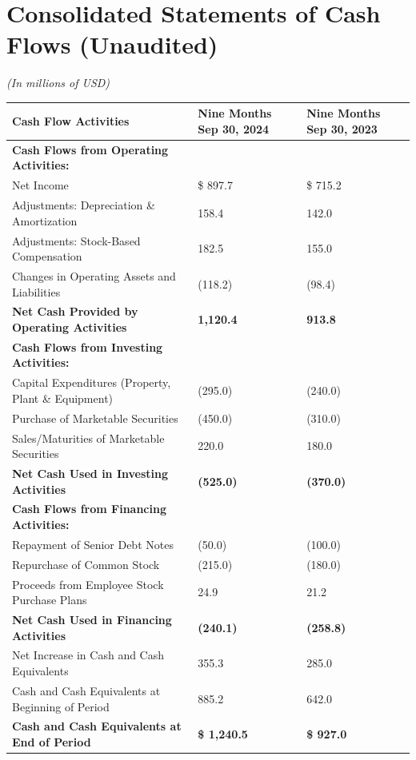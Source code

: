 \documentclass[10pt,a4paper]{article}
\begin{document}
\section{Consolidated Statements of Cash Flows (Unaudited)}
{\small\itshape (In millions of USD)}

\vspace{-2pt}
\begin{tabularx}{\textwidth}{K M M}
\toprule
{}
\color{white}\bfseries Cash Flow Activities & \color{white}\bfseries Nine Months Sep 30, 2024 & \color{white}\bfseries Nine Months Sep 30, 2023 \\
\midrule
\textbf{Cash Flows from Operating Activities:} & & \\{}
\quad Net Income & \$ 897.7 & \$ 715.2 \\{}
\quad Adjustments: Depreciation \& Amortization & 158.4 & 142.0 \\{}
\quad Adjustments: Stock-Based Compensation & 182.5 & 155.0 \\{}
\quad Changes in Operating Assets and Liabilities & (118.2) & (98.4) \\
\cmidrule(lr){2-3}
\quad \textbf{Net Cash Provided by Operating Activities} & \textbf{1,120.4} & \textbf{913.8} \\
\midrule
\textbf{Cash Flows from Investing Activities:} & & \\{}
\quad Capital Expenditures (Property, Plant \& Equipment) & (295.0) & (240.0) \\{}
\quad Purchase of Marketable Securities & (450.0) & (310.0) \\{}
\quad Sales/Maturities of Marketable Securities & 220.0 & 180.0 \\
\cmidrule(lr){2-3}
\quad \textbf{Net Cash Used in Investing Activities} & \textbf{(525.0)} & \textbf{(370.0)} \\
\midrule
\textbf{Cash Flows from Financing Activities:} & & \\{}
\quad Repayment of Senior Debt Notes & (50.0) & (100.0) \\{}
\quad Repurchase of Common Stock & (215.0) & (180.0) \\{}
\quad Proceeds from Employee Stock Purchase Plans & 24.9 & 21.2 \\
\cmidrule(lr){2-3}
\quad \textbf{Net Cash Used in Financing Activities} & \textbf{(240.1)} & \textbf{(258.8)} \\
\midrule
Net Increase in Cash and Cash Equivalents & 355.3 & 285.0 \\{}
Cash and Cash Equivalents at Beginning of Period & 885.2 & 642.0 \\
\midrule
\textbf{Cash and Cash Equivalents at End of Period} & \textbf{\$ 1,240.5} & \textbf{\$ 927.0} \\
\bottomrule
\end{tabularx}
\end{document}
